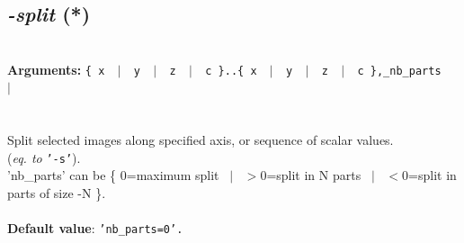\documentclass[a4paper,11pt,twoside]{book}
\begin{document}
\subsection{\emph{-split} (*)}\vspace*{-0.5em}
~\\\textbf{Arguments: } 
{\small \texttt{\{ x ~$|$~ y ~$|$~ z ~$|$~ c \}..\{ x ~$|$~ y ~$|$~ z ~$|$~ c \},\_nb\_parts}}~~~$|$\\
\\~\\
Split selected images along specified axis, or sequence of scalar values.
~\\(\emph{eq. to} {\small \texttt{'-s'}}).
~\\'nb\_parts' can be \{ 0=maximum split ~$|$~ $>$0=split in N parts ~$|$~ $<$0=split in parts of size -N \}.
~\\~\\\textbf{Default value}: {\small \texttt{'nb\_parts=0'.}}
\end{document}
